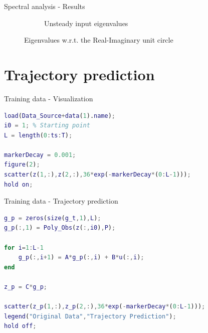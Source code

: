 \documentclass{beamer}
\begin{document}
\begin{frame}{Spectral analysis - Results}
\begin{figure}
\begin{subfigure}[b]{0.45\textwidth}
            \caption{Unsteady input eigenvalues}
            \label{fig:unsteady_eigen}
        \end{subfigure}
        \caption{Eigenvalues w.r.t. the Real-Imaginary unit circle}
        \label{fig:eigen}
    \end{figure}
\end{frame}


\section{Trajectory prediction}

\begin{frame}[fragile]{Training data - Visualization}
    \begin{lstlisting}[language=Matlab]
load(Data_Source+data(1).name);
i0 = 1; % Starting point
L = length(0:ts:T);

markerDecay = 0.001;
figure(2);
scatter(z(1,:),z(2,:),36*exp(-markerDecay*(0:L-1)));
hold on;
    \end{lstlisting}
\end{frame}

\begin{frame}[fragile]{Training data - Trajectory prediction}
    \begin{lstlisting}[language=Matlab]
g_p = zeros(size(g_t,1),L);
g_p(:,1) = Poly_Obs(z(:,i0),P);

for i=1:L-1
    g_p(:,i+1) = A*g_p(:,i) + B*u(:,i);
end

z_p = C*g_p;

scatter(z_p(1,:),z_p(2,:),36*exp(-markerDecay*(0:L-1)));
legend("Original Data","Trajectory Prediction");
hold off;
    \end{lstlisting}
\end{frame}
\end{document}
